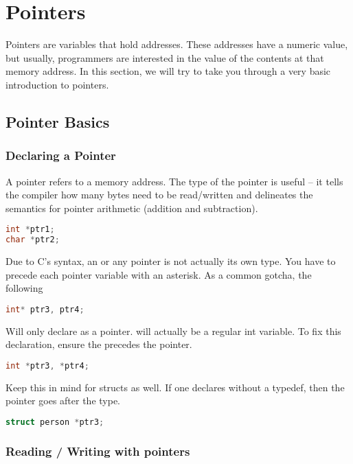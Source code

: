 \section{Pointers}

Pointers are variables that hold addresses.
These addresses have a numeric value, but usually, programmers are interested in the value of the contents at that memory address.
In this section, we will try to take you through a very basic introduction to pointers.

\subsection{Pointer Basics}

\subsubsection{Declaring a Pointer}

A pointer refers to a memory address. The type of the pointer is useful -- it tells the compiler how many bytes need to be read/written and delineates the semantics for pointer arithmetic (addition and subtraction).

\begin{lstlisting}[language=C]
int *ptr1;
char *ptr2;
\end{lstlisting}

Due to C's syntax, an  or any pointer is not actually its own type.
You have to precede each pointer variable with an asterisk.
As a common gotcha, the following

\begin{lstlisting}[language=C]
int* ptr3, ptr4;
\end{lstlisting}

Will only declare  as a pointer.
 will actually be a regular int variable.
To fix this declaration, ensure the \keyword{*} precedes the pointer.

\begin{lstlisting}[language=C]
int *ptr3, *ptr4;
\end{lstlisting}

Keep this in mind for structs as well.
If one declares without a typedef, then the pointer goes after the type.

\begin{lstlisting}[language=C]
struct person *ptr3;
\end{lstlisting}

\subsubsection{Reading / Writing with pointers}

